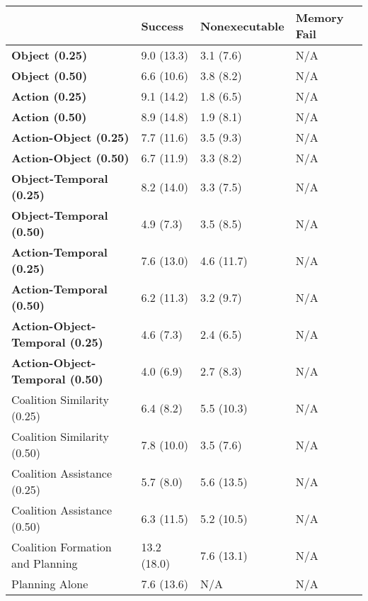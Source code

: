 \begin{tabular}{llll}
\hline
                                        & Success     & Nonexecutable   & Memory Fail   \\
\hline
 \textbf{Object (0.25)}                 & 9.0 (13.3)  & 3.1 (7.6)       & N/A           \\
 \textbf{Object (0.50)}                 & 6.6 (10.6)  & 3.8 (8.2)       & N/A           \\
 \textbf{Action (0.25)}                 & 9.1 (14.2)  & 1.8 (6.5)       & N/A           \\
 \textbf{Action (0.50)}                 & 8.9 (14.8)  & 1.9 (8.1)       & N/A           \\
 \textbf{Action-Object (0.25)}          & 7.7 (11.6)  & 3.5 (9.3)       & N/A           \\
 \textbf{Action-Object (0.50)}          & 6.7 (11.9)  & 3.3 (8.2)       & N/A           \\
 \textbf{Object-Temporal (0.25)}        & 8.2 (14.0)  & 3.3 (7.5)       & N/A           \\
 \textbf{Object-Temporal (0.50)}        & 4.9 (7.3)   & 3.5 (8.5)       & N/A           \\
 \textbf{Action-Temporal (0.25)}        & 7.6 (13.0)  & 4.6 (11.7)      & N/A           \\
 \textbf{Action-Temporal (0.50)}        & 6.2 (11.3)  & 3.2 (9.7)       & N/A           \\
 \textbf{Action-Object-Temporal (0.25)} & 4.6 (7.3)   & 2.4 (6.5)       & N/A           \\
 \textbf{Action-Object-Temporal (0.50)} & 4.0 (6.9)   & 2.7 (8.3)       & N/A           \\
 Coalition Similarity (0.25)            & 6.4 (8.2)   & 5.5 (10.3)      & N/A           \\
 Coalition Similarity (0.50)            & 7.8 (10.0)  & 3.5 (7.6)       & N/A           \\
 Coalition Assistance (0.25)            & 5.7 (8.0)   & 5.6 (13.5)      & N/A           \\
 Coalition Assistance (0.50)            & 6.3 (11.5)  & 5.2 (10.5)      & N/A           \\
 Coalition Formation and Planning       & 13.2 (18.0) & 7.6 (13.1)      & N/A           \\
 Planning Alone                         & 7.6 (13.6)  & N/A             & N/A           \\
\hline
\end{tabular}
